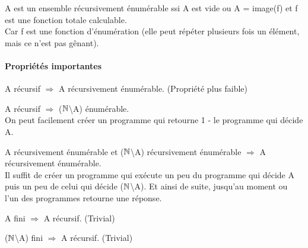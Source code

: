 \begin{myprop}
	A est un ensemble récursivement énumérable ssi A est vide ou A = image(f) et f
	est une fonction totale calculable. \\
	Car f est une fonction d'énumération (elle
	peut répéter plusieurs fois un élément, mais ce n'est pas gênant).
\end{myprop}


\paragraph{Propriétés importantes}
\label{par:propri_t_s_importantes}
\begin{myprop}
	A récursif $\Rightarrow$ A récursivement énumérable. (Propriété plus
		faible)
\end{myprop}

\begin{myprop}
	A récursif $\Rightarrow$ ($\mathbb{N}$\textbackslash A) énumérable.\\ On peut facilement créer
		un programme qui retourne 1 - le programme qui décide A.
\end{myprop}

\begin{myprop}
	A récursivement énumérable et ($\mathbb{N}$\textbackslash A) récursivement énumérable 
		$\Rightarrow$ A récursivement énumérable.\\ Il suffit de créer un programme
		qui exécute un peu du programme qui décide A puis un peu de celui qui
		décide ($\mathbb{N}$\textbackslash A). Et ainsi de suite, jusqu'au moment ou l'un 
		des programmes retourne une réponse.
\end{myprop}

\begin{myprop}
	A fini $\Rightarrow$ A récursif. (Trivial)
\end{myprop}

\begin{myprop}
	($\mathbb{N}$\textbackslash A) fini $\Rightarrow$ A récursif. (Trivial)
\end{myprop}



